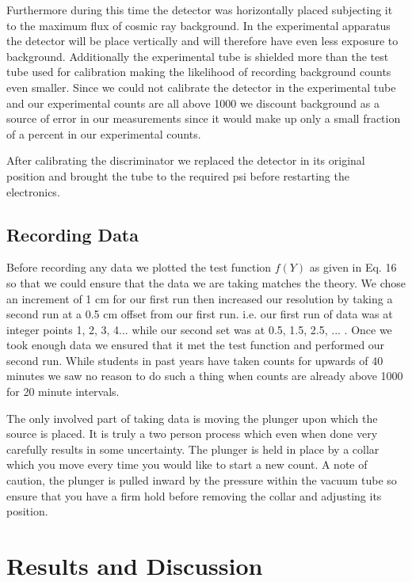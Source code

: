 \indent \indent Furthermore during this time the detector was horizontally placed subjecting it to the maximum flux of cosmic ray background.  In the experimental apparatus the detector will be place vertically and will therefore have even less exposure to background. Additionally the experimental tube is shielded more than the test tube used for calibration making the likelihood of recording background counts even smaller.  Since we could not calibrate the detector in the experimental tube and our experimental counts are all above 1000 we discount background as a source of error in our measurements since it would make up only a small fraction of a percent in our experimental counts.  

\indent \indent After calibrating the discriminator we replaced the detector in its original position and brought the tube to the required psi before restarting the electronics. 


\subsection{Recording Data}
\indent \indent Before recording any data we plotted the test function $f(Y)$ as given in Eq. 16 so that we could ensure that the data we are taking matches the theory.  We chose an increment of 1 cm for our first run then increased our resolution by taking a second run at a 0.5 cm offset from our first run.  i.e. our first run of data was at integer points 1, 2, 3, 4... while our second set was at 0.5, 1.5, 2.5, ... . Once we took enough data we ensured that it met the test function and performed our second run.  While students in past years have taken counts for upwards of 40 minutes we saw no reason to do such a thing when counts are already above 1000 for 20 minute intervals.  

\indent \indent The only involved part of taking data is moving the plunger upon which the source is placed.  It is truly a two person process which even when done very carefully results in some uncertainty.  The plunger is held in place by a collar which you move every time you would like to start a new count.  A note of caution, the plunger is pulled inward by the pressure within the vacuum tube so ensure that you have a firm hold before removing the collar and adjusting its position. 

\section{Results and Discussion}
